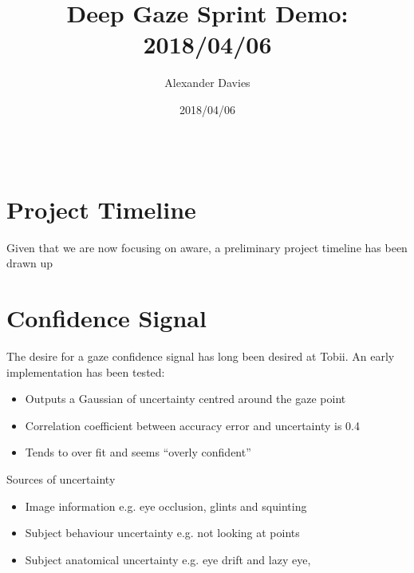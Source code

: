 \documentclass[aspectratio=1610,t,notes=hide]{beamer}
\title{Deep Gaze Sprint Demo: 2018/04/06}
\subtitle{}
\author{Alexander Davies}
\date{2018/04/06}
\begin{document}
\begin{frame}
\titlepage
\end{frame}

\plainslide{}
{
	\vskip1cm
	\begin{columns}[T, totalwidth=\linewidth]
		\begin{contentcolumn}
	    	\tableofcontents[sections={1-2}]
		\end{contentcolumn}
		\begin{contentcolumn}
			\tableofcontents[sections={3-4}]
		\end{contentcolumn}
    \end{columns}
}

\section{Project Timeline}


{
Given that we are now focusing on aware, a preliminary project timeline has been
drawn up

\begin{centering}
\end{centering}
}

\section{Confidence Signal}

{
The desire for a gaze confidence signal has long been desired at Tobii. An early
implementation has been tested:
\begin{itemize}
  \item Outputs a Gaussian of uncertainty centred around the gaze point
  \item Correlation coefficient between accuracy error and uncertainty is 0.4 
  \item Tends to over fit and seems ``overly confident'' 
\end{itemize}
Sources of uncertainty
\begin{itemize}
  \item Image information e.g. eye occlusion, glints and squinting
  \item Subject behaviour uncertainty e.g. not looking at points
  \item Subject anatomical uncertainty e.g. eye drift and lazy eye, 
\end{itemize}
}
\end{document}
